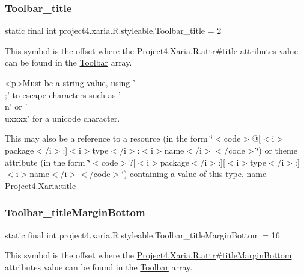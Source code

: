 \subsubsection{\texorpdfstring{Toolbar\+\_\+title}{Toolbar\_title}}
{\footnotesize\ttfamily static final int project4.\+xaria.\+R.\+styleable.\+Toolbar\+\_\+title = 2\hspace{0.3cm}{\ttfamily [static]}}

This symbol is the offset where the \hyperlink{}{Project4.\+Xaria.\+R.\+attr\#title} attribute\textquotesingle{}s value can be found in the \hyperlink{classproject4_1_1xaria_1_1R_1_1styleable_af6c30f9e9e086f6bf4e510669443fa59}{Toolbar} array.

\begin{DoxyVerb}      <p>Must be a string value, using '\\;' to escape characters such as '\\n' or '\\uxxxx' for a unicode character.
\end{DoxyVerb}
 

This may also be a reference to a resource (in the form \char`\"{}$<$code$>$@\mbox{[}$<$i$>$package$<$/i$>$\+:\mbox{]}$<$i$>$type$<$/i$>$\+:$<$i$>$name$<$/i$>$$<$/code$>$\char`\"{}) or theme attribute (in the form \char`\"{}$<$code$>$?\mbox{[}$<$i$>$package$<$/i$>$\+:\mbox{]}\mbox{[}$<$i$>$type$<$/i$>$\+:\mbox{]}$<$i$>$name$<$/i$>$$<$/code$>$\char`\"{}) containing a value of this type.  name Project4.\+Xaria\+:title \mbox{\label{classproject4_1_1xaria_1_1R_1_1styleable_a246fa138dbd3b691aa3595a8fb636a01}} 
\subsubsection{\texorpdfstring{Toolbar\+\_\+title\+Margin\+Bottom}{Toolbar\_titleMarginBottom}}
{\footnotesize\ttfamily static final int project4.\+xaria.\+R.\+styleable.\+Toolbar\+\_\+title\+Margin\+Bottom = 16\hspace{0.3cm}{\ttfamily [static]}}

This symbol is the offset where the \hyperlink{}{Project4.\+Xaria.\+R.\+attr\#title\+Margin\+Bottom} attribute\textquotesingle{}s value can be found in the \hyperlink{classproject4_1_1xaria_1_1R_1_1styleable_af6c30f9e9e086f6bf4e510669443fa59}{Toolbar} array.

